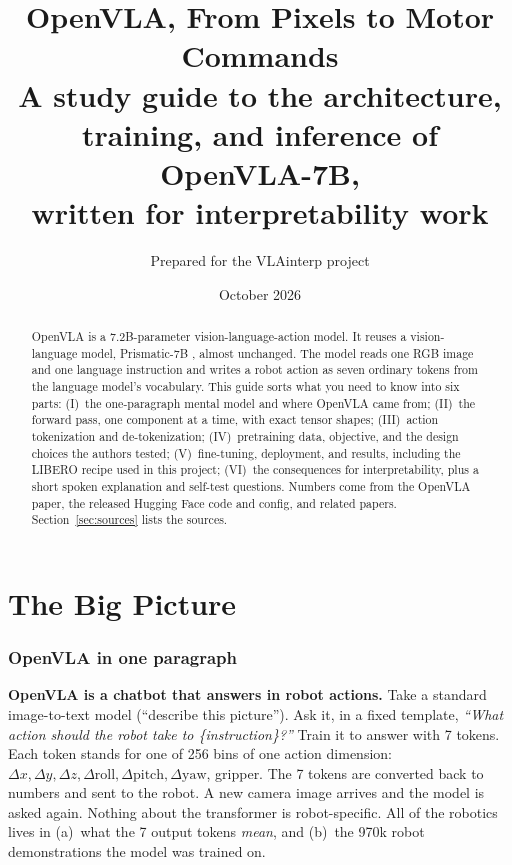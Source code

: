 \documentclass[11pt]{article}
\title{\textbf{OpenVLA, From Pixels to Motor Commands}\\[4pt]
\large A study guide to the architecture, training, and inference of OpenVLA-7B,\\
written for interpretability work}
\author{Prepared for the VLAinterp project}
\date{October 2026}
\begin{document}
\maketitle
\thispagestyle{empty}

\begin{abstract}
\noindent OpenVLA \cite{kim2024openvla} is a 7.2B-parameter vision-language-action model. It reuses a vision-language model, Prismatic-7B \cite{karamcheti2024prismatic}, almost unchanged. The model reads one RGB image and one language instruction and writes a robot action as seven ordinary tokens from the language model's vocabulary. This guide sorts what you need to know into six parts: (I)~the one-paragraph mental model and where OpenVLA came from; (II)~the forward pass, one component at a time, with exact tensor shapes; (III)~action tokenization and de-tokenization; (IV)~pretraining data, objective, and the design choices the authors tested; (V)~fine-tuning, deployment, and results, including the LIBERO recipe used in this project; (VI)~the consequences for interpretability, plus a short spoken explanation and self-test questions. Numbers come from the OpenVLA paper, the released Hugging Face code and config, and related papers. Section~\ref{sec:sources} lists the sources.
\end{abstract}

\tableofcontents
\newpage

\part{The Big Picture}

\section{OpenVLA in one paragraph}

\begin{mental}
\textbf{OpenVLA is a chatbot that answers in robot actions.} Take a standard image-to-text model (``describe this picture''). Ask it, in a fixed template, \emph{``What action should the robot take to \{instruction\}?''} Train it to answer with 7 tokens. Each token stands for one of 256 bins of one action dimension:
$\Delta x, \Delta y, \Delta z, \Delta\text{roll}, \Delta\text{pitch}, \Delta\text{yaw}$, gripper.
The 7 tokens are converted back to numbers and sent to the robot. A new camera image arrives and the model is asked again. Nothing about the transformer is robot-specific. All of the robotics lives in (a)~what the 7 output tokens \emph{mean}, and (b)~the 970k robot demonstrations the model was trained on.
\end{mental}
\end{document}
